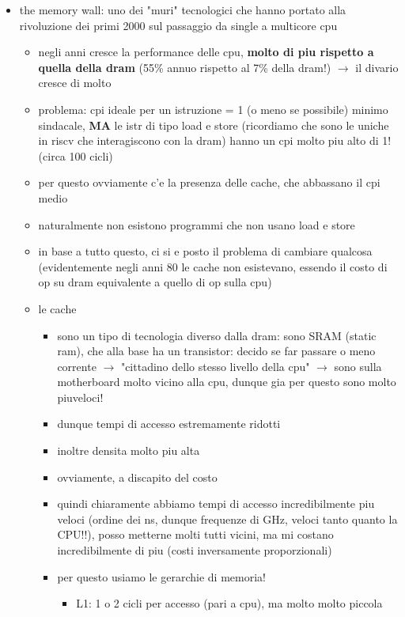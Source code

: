 \begin{itemize}
  \item the memory wall: uno dei "muri" tecnologici che hanno portato alla rivoluzione dei primi 2000 sul passaggio da single a multicore cpu
    \begin{itemize}
      \item negli anni cresce la performance delle cpu, \textbf{molto di piu rispetto a quella della dram} (55\% annuo rispetto al 7\% della dram!) $\rightarrow$ il divario cresce di molto
      \item problema: cpi ideale per un istruzione = 1 (o meno se possibile) minimo sindacale, \textbf{MA} le istr di tipo load e store (ricordiamo che sono le uniche in riscv che interagiscono con la dram) hanno un cpi molto piu alto di 1! (circa 100 cicli)
      \item per questo ovviamente c'e la presenza delle cache, che abbassano il cpi medio
      \item naturalmente non esistono programmi che non usano load e store
      \item in base a tutto questo, ci si e posto il problema di cambiare qualcosa (evidentemente negli anni 80 le cache non esistevano, essendo il costo di op su dram equivalente a quello di op sulla cpu)
      \item le cache
        \begin{itemize}
          \item sono un tipo di tecnologia diverso dalla dram: sono SRAM (static ram), che alla base ha un transistor: decido se far passare o meno corrente $\rightarrow$ "cittadino dello stesso livello della cpu" $\rightarrow$ sono sulla motherboard molto vicino alla cpu, dunque gia per questo sono molto piuveloci!
          \item dunque tempi di accesso estremamente ridotti
          \item inoltre densita molto piu alta
          \item ovviamente, a discapito del costo
          \item quindi chiaramente abbiamo tempi di accesso incredibilmente piu veloci (ordine dei ns, dunque frequenze di GHz, veloci tanto quanto la CPU!!), posso metterne molti tutti vicini, ma mi costano incredibilmente di piu (costi inversamente proporzionali)
          \item per questo usiamo le gerarchie di memoria!
            \begin{itemize}
              \item L1: 1 o 2 cicli per accesso (pari a cpu), ma molto molto piccola

\end{itemize}
\end{itemize}
\end{itemize}
\end{itemize}
